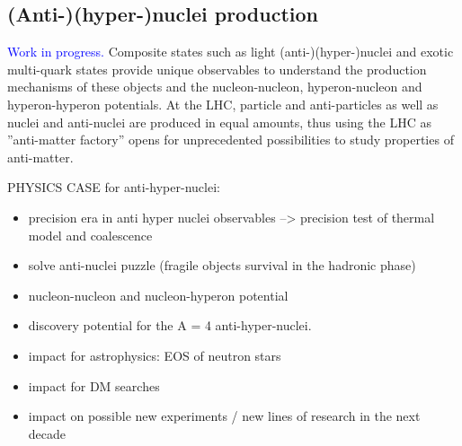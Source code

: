 \subsection{(Anti-)(hyper-)nuclei production} 
\textcolor{blue}{Work in progress.}
Composite states such as light (anti-)(hyper-)nuclei and exotic multi-quark states provide unique observables to understand the production mechanisms of these objects and the nucleon-nucleon, hyperon-nucleon and hyperon-hyperon potentials. 
At the LHC, particle and anti-particles as well as nuclei and anti-nuclei are produced in equal amounts, thus using the LHC as ''anti-matter factory'' opens for unprecedented possibilities to study properties of anti-matter.

PHYSICS CASE for anti-hyper-nuclei:
\begin{itemize}
\item precision era in anti hyper nuclei observables --> precision test of thermal model and coalescence
\item solve anti-nuclei puzzle (fragile objects survival in the hadronic phase)
\item nucleon-nucleon and nucleon-hyperon potential
\item discovery potential for the A = 4 anti-hyper-nuclei.
\item impact for astrophysics: EOS of neutron stars 
\item impact for DM searches
\item impact on possible new experiments / new lines of research in the next decade
\end{itemize}


